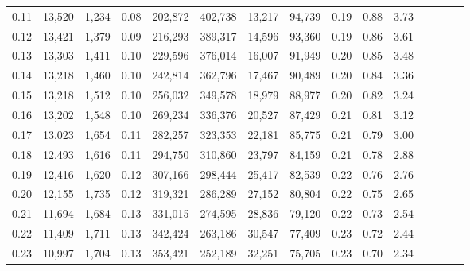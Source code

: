 \begin{tabular}{rrrcrrrrrrrrrrr}
0.11 &  13,520 &   1,234 &                                       0.08 &  202,872 &  402,738 &   13,217 &   94,739 &  0.19 &  0.88 &                         3.73 \\
0.12 &  13,421 &   1,379 &                                       0.09 &  216,293 &  389,317 &   14,596 &   93,360 &  0.19 &  0.86 &                         3.61 \\
0.13 &  13,303 &   1,411 &                                       0.10 &  229,596 &  376,014 &   16,007 &   91,949 &  0.20 &  0.85 &                         3.48 \\
0.14 &  13,218 &   1,460 &                                       0.10 &  242,814 &  362,796 &   17,467 &   90,489 &  0.20 &  0.84 &                         3.36 \\
0.15 &  13,218 &   1,512 &                                       0.10 &  256,032 &  349,578 &   18,979 &   88,977 &  0.20 &  0.82 &                         3.24 \\
0.16 &  13,202 &   1,548 &                                       0.10 &  269,234 &  336,376 &   20,527 &   87,429 &  0.21 &  0.81 &                         3.12 \\
0.17 &  13,023 &   1,654 &                                       0.11 &  282,257 &  323,353 &   22,181 &   85,775 &  0.21 &  0.79 &                         3.00 \\
0.18 &  12,493 &   1,616 &                                       0.11 &  294,750 &  310,860 &   23,797 &   84,159 &  0.21 &  0.78 &                         2.88 \\
0.19 &  12,416 &   1,620 &                                       0.12 &  307,166 &  298,444 &   25,417 &   82,539 &  0.22 &  0.76 &                         2.76 \\
0.20 &  12,155 &   1,735 &                                       0.12 &  319,321 &  286,289 &   27,152 &   80,804 &  0.22 &  0.75 &                         2.65 \\
0.21 &  11,694 &   1,684 &                                       0.13 &  331,015 &  274,595 &   28,836 &   79,120 &  0.22 &  0.73 &                         2.54 \\
0.22 &  11,409 &   1,711 &                                       0.13 &  342,424 &  263,186 &   30,547 &   77,409 &  0.23 &  0.72 &                         2.44 \\
0.23 &  10,997 &   1,704 &                                       0.13 &  353,421 &  252,189 &   32,251 &   75,705 &  0.23 &  0.70 &                         2.34 \\

\end{tabular}
